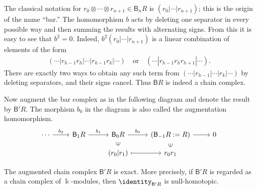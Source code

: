 The classical notation for
$r_0\otimes\cdots\otimes r_{n+1}\in\mathsf{B}_nR$ is
$(r_0|\cdots|r_{n+1})$; this is the origin of the name ``bar.'' The
homomorphism $b$ acts by deleting one separator in every possible way and
then summing the results with alternating signs. From this it is easy to see
that $b^2=0$. Indeed, $b^2(r_0|\cdots|r_{n+1})$ is a linear combination of
elements of the form
\begin{gather*}
	(\cdots |r_{h-1} r_h| \cdots |r_{k-1} r_k| \cdots )
	\quad \text{or} \quad
	( \cdots | r_{h-1} r_h r_{h+1} | \cdots ).
\end{gather*}
There are exactly two ways to obtain any such term from
$(\cdots|r_{h-1}|\cdots|r_k|\cdots)$ by deleting separators, and their signs
cancel. Thus $\mathsf{B}R$ is indeed a chain complex.

Now augment the bar complex as in the following diagram and denote the result
by $\mathsf{B}'R$. The morphism $b_0$ in the diagram is also called the
augmentation homomorphism.
\[\begin{tikzcd}[row sep=small]
	\cdots \arrow[r, "b_2"] & \mathsf{B}_1 R \arrow[r, "b_1"]
	& \mathsf{B}_0 R \arrow[r, "b_0"] & (\mathsf{B}_{-1} R := R) \arrow[r] & 0 \\
	& & (r_0 | r_1) \arrow[mapsto, r]
	\arrow[phantom, u, "\in" description, sloped]
	& r_0 r_1 \arrow[phantom, u, "\in" description, sloped] &
\end{tikzcd}\]

\begin{lemma}\label{prop:HH-bar-exactness}
	The augmented chain complex $\mathsf{B}'R$ is exact. More precisely, if
	$\mathsf{B}'R$ is regarded as a chain complex of $\Bbbk$-modules, then
	$\identity_{\mathsf{B}'R}$ is null-homotopic.
\end{lemma}

